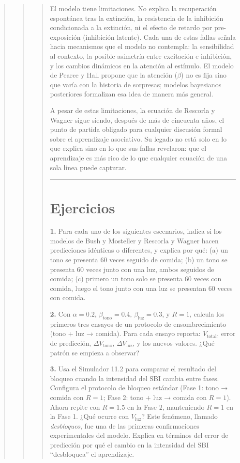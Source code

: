 \documentclass[
  letterpaper,
  DIV=11,
  numbers=noendperiod]{scrreprt}
\begin{document}
\begin{tcolorbox}[enhanced jigsaw, arc=.35mm, bottomrule=.15mm, breakable, colback=white, colframe=quarto-callout-note-color-frame, left=2mm, leftrule=.75mm, opacityback=0, rightrule=.15mm, toprule=.15mm]
\begin{quote}
\begin{quote}
\begin{quote}
El modelo tiene limitaciones. No explica la recuperación espontánea tras
la extinción, la resistencia de la inhibición condicionada a la
extinción, ni el efecto de retardo por pre-exposición (inhibición
latente). Cada una de estas fallas señala hacia mecanismos que el modelo
no contempla: la sensibilidad al contexto, la posible asimetría entre
excitación e inhibición, y los cambios dinámicos en la atención al
estímulo. El modelo de Pearce y Hall propone que la atención (\(\beta\))
no es fija sino que varía con la historia de sorpresas; modelos
bayesianos posteriores formalizan esa idea de manera más general.

A pesar de estas limitaciones, la ecuación de Rescorla y Wagner sigue
siendo, después de más de cincuenta años, el punto de partida obligado
para cualquier discusión formal sobre el aprendizaje asociativo. Su
legado no está solo en lo que explica sino en lo que sus fallas
revelaron: que el aprendizaje es más rico de lo que cualquier ecuación
de una sola línea puede capturar.

\begin{center}\rule{0.5\linewidth}{0.5pt}\end{center}

\mbox{}%
\section{Ejercicios}\label{ejercicios-3}

\textbf{1.} Para cada uno de los siguientes escenarios, indica si los
modelos de Bush y Mosteller y Rescorla y Wagner hacen predicciones
idénticas o diferentes, y explica por qué: (a) un tono se presenta 60
veces seguido de comida; (b) un tono se presenta 60 veces junto con una
luz, ambos seguidos de comida; (c) primero un tono solo se presenta 60
veces con comida, luego el tono junto con una luz se presentan 60 veces
con comida.

\textbf{2.} Con \(\alpha = 0.2\), \(\beta_{\text{tono}} = 0.4\),
\(\beta_{\text{luz}} = 0.3\), y \(R = 1\), calcula los primeros tres
ensayos de un protocolo de ensombrecimiento (tono + luz → comida). Para
cada ensayo reporta: \(V_{\text{total}}\), error de predicción,
\(\Delta V_{\text{tono}}\), \(\Delta V_{\text{luz}}\), y los nuevos
valores. ¿Qué patrón se empieza a observar?

\textbf{3.} Usa el Simulador 11.2 para comparar el resultado del bloqueo
cuando la intensidad del SBI cambia entre fases. Configura el protocolo
de bloqueo estándar (Fase 1: tono → comida con \(R = 1\); Fase 2: tono +
luz → comida con \(R = 1\)). Ahora repite con \(R = 1.5\) en la Fase 2,
manteniendo \(R = 1\) en la Fase 1. ¿Qué ocurre con \(V_{\text{luz}}\)?
Este fenómeno, llamado \emph{desbloqueo}, fue una de las primeras
confirmaciones experimentales del modelo. Explica en términos del error
de predicción por qué el cambio en la intensidad del SBI ``desbloquea''
el aprendizaje.


\end{quote}
\end{quote}
\end{quote}
\end{tcolorbox}
\end{document}
